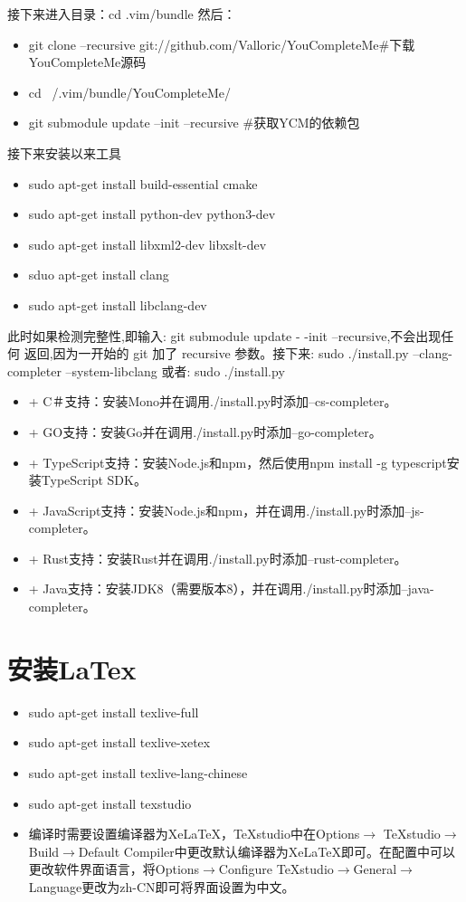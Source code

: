 \documentclass[utf8]{book}
\begin{document}
\begin{appendices}
	接下来进入目录：cd  .vim/bundle
	然后：
	\begin{itemize}
		\item git clone --recursive git://github.com/Valloric/YouCompleteMe\#下载YouCompleteMe源码
		\item cd ~/.vim/bundle/YouCompleteMe/
		\item git submodule update --init --recursive
		\#获取YCM的依赖包
	\end{itemize}
	接下来安装以来工具
	\begin{itemize}
		\item sudo apt-get install build-essential cmake
		\item sudo apt-get install python-dev python3-dev
		\item sudo apt-get install libxml2-dev libxslt-dev
		\item sduo apt-get install clang
		\item sudo apt-get install libclang-dev
	\end{itemize}	
	此时如果检测完整性,即输入:
	git submodule update - -init --recursive,不会出现任何
	返回,因为一开始的 git 加了 recursive 参数。接下来:
	sudo ./install.py --clang-completer --system-libclang
	或者: sudo ./install.py
	\begin{itemize}
		\item + C＃支持：安装Mono并在调用./install.py时添加--cs-completer。 
		\item + GO支持：安装Go并在调用./install.py时添加--go-completer。 
		\item + TypeScript支持：安装Node.js和npm，然后使用npm install -g typescript安装TypeScript SDK。 
		\item + JavaScript支持：安装Node.js和npm，并在调用./install.py时添加--js-completer。 
		\item + Rust支持：安装Rust并在调用./install.py时添加--rust-completer。 
		\item + Java支持：安装JDK8（需要版本8），并在调用./install.py时添加--java-completer。
	\end{itemize}		
	

	\section{安装LaTex}\label{u11}
	\begin{itemize}
		\item sudo apt-get install texlive-full
		\item sudo apt-get install texlive-xetex
		\item sudo apt-get install texlive-lang-chinese
		\item sudo apt-get install texstudio
		\item 编译时需要设置编译器为XeLaTeX，TeXstudio中在Options$\longrightarrow$ TeXstudio$\longrightarrow$Build$\longrightarrow$Default Compiler中更改默认编译器为XeLaTeX即可。在配置中可以更改软件界面语言，将Options$\longrightarrow$Configure TeXstudio$\longrightarrow$General$\longrightarrow$Language更改为zh-CN即可将界面设置为中文。


\end{itemize}
\end{appendices}
\end{document}
